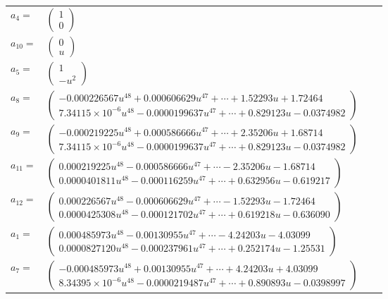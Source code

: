 \documentclass[1p]{elsarticle_modified}
\theoremstyle{definition}
\begin{document}
\begin{tabular}{m{7pt} m{180pt} m{7pt} m{180pt} }
\flushright $a_{4}=$&$\begin{pmatrix}1\\0\end{pmatrix}$ \\
\flushright $a_{10}=$&$\begin{pmatrix}0\\u\end{pmatrix}$ \\
\flushright $a_{5}=$&$\begin{pmatrix}1\\- u^2\end{pmatrix}$ \\
\flushright $a_{8}=$&$\begin{pmatrix}-0.000226567 u^{48}+0.000606629 u^{47}+\cdots+1.52293 u+1.72464\\7.34115\times10^{-6} u^{48}-0.0000199637 u^{47}+\cdots+0.829123 u-0.0374982\end{pmatrix}$ \\
\flushright $a_{9}=$&$\begin{pmatrix}-0.000219225 u^{48}+0.000586666 u^{47}+\cdots+2.35206 u+1.68714\\7.34115\times10^{-6} u^{48}-0.0000199637 u^{47}+\cdots+0.829123 u-0.0374982\end{pmatrix}$ \\
\flushright $a_{11}=$&$\begin{pmatrix}0.000219225 u^{48}-0.000586666 u^{47}+\cdots-2.35206 u-1.68714\\0.0000401811 u^{48}-0.000116259 u^{47}+\cdots+0.632956 u-0.619217\end{pmatrix}$ \\
\flushright $a_{12}=$&$\begin{pmatrix}0.000226567 u^{48}-0.000606629 u^{47}+\cdots-1.52293 u-1.72464\\0.0000425308 u^{48}-0.000121702 u^{47}+\cdots+0.619218 u-0.636090\end{pmatrix}$ \\
\flushright $a_{1}=$&$\begin{pmatrix}0.000485973 u^{48}-0.00130955 u^{47}+\cdots-4.24203 u-4.03099\\0.0000827120 u^{48}-0.000237961 u^{47}+\cdots+0.252174 u-1.25531\end{pmatrix}$ \\
\flushright $a_{7}=$&$\begin{pmatrix}-0.000485973 u^{48}+0.00130955 u^{47}+\cdots+4.24203 u+4.03099\\8.34395\times10^{-6} u^{48}-0.0000219487 u^{47}+\cdots+0.890893 u-0.0398997\end{pmatrix}$ \\

\end{tabular}
\end{document}
